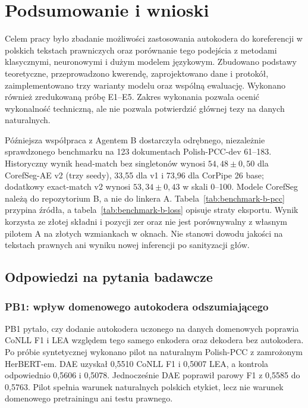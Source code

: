 \chapter{Podsumowanie i wnioski}
\label{chap:podsumowanie}

Celem pracy było zbadanie możliwości zastosowania autokodera do koreferencji w polskich tekstach prawniczych oraz porównanie tego podejścia z metodami klasycznymi, neuronowymi i dużym modelem językowym. Zbudowano podstawy teoretyczne, przeprowadzono kwerendę, zaprojektowano dane i protokół, zaimplementowano trzy warianty modelu oraz wspólną ewaluację. Wykonano również zredukowaną próbę E1--E5. Zakres wykonania pozwala ocenić wykonalność techniczną, ale nie pozwala potwierdzić głównej tezy na danych naturalnych.

Późniejsza współpraca z Agentem B dostarczyła odrębnego, niezależnie sprawdzonego benchmarku na 123 dokumentach Polish-PCC-dev 61--183. Historyczny wynik head-match bez singletonów wynosi $54,48 \pm 0,50$ dla CorefSeg-AE v2 (trzy seedy), 33,55 dla v1 i 73,96 dla CorPipe 26 base; dodatkowy exact-match v2 wynosi $53,34 \pm 0,43$ w skali 0--100. Modele CorefSeg należą do repozytorium B, a nie do linkera A. Tabela~\ref{tab:benchmark-b-pcc} przypina źródła, a tabela~\ref{tab:benchmark-b-loss} opisuje straty eksportu. Wynik korzysta ze złotej składni i pozycji zer oraz nie jest porównywalny z własnym pilotem A na złotych wzmiankach w oknach. Nie stanowi dowodu jakości na tekstach prawnych ani wyniku nowej inferencji po sanityzacji głów.

\section{Odpowiedzi na pytania badawcze}

\subsection{PB1: wpływ domenowego autokodera odszumiającego}

PB1 pytało, czy dodanie autokodera uczonego na danych domenowych poprawia CoNLL F1 i LEA względem tego samego enkodera oraz dekodera bez autokodera. Po próbie syntetycznej wykonano pilot na naturalnym Polish-PCC z zamrożonym HerBERT-em. DAE uzyskał 0,5510 CoNLL F1 i 0,5007 LEA, a kontrola odpowiednio 0,5606 i 0,5078. Jednocześnie DAE poprawił parowy F1 z 0,5585 do 0,5763. Pilot spełnia warunek naturalnych polskich etykiet, lecz nie warunek domenowego pretrainingu ani testu prawnego.

